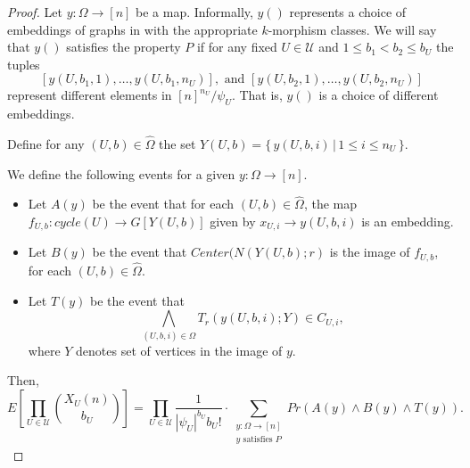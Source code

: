 \documentclass[11pt,notitlepage]{report}
\theoremstyle{definition}
\begin{document}
\begin{proof}
	Let $y: \Omega \rightarrow [n]$ be a map. Informally, $y()$
	represents a choice of embeddings of graphs in with the appropriate
	$k$-morphism classes. We will say that $y()$ satisfies the property
	$P$ if for any fixed $U\in \mathcal{U}$ and $1\leq b_1<b_2\leq b_{U}$
	the tuples
	\[ [y(U,b_1,1), \dots, y(U,b_1,n_U)], \text{ and }
	[y(U,b_2,1), \dots, y(U,b_2,n_U)] \]
	represent different elements in $[n]^{n_U}/\psi_U$. That is, $y()$ is 
	a choice of different embeddings.\par
	Define for any $(U,b)\in \widehat{\Omega}$
	the set $Y(U,b)=\{ \, y(U,b,i) \, | \, 1\leq i \leq n_U \, \}$.
	
	We define the following events for a given $y:\Omega\rightarrow [n]$.
	\begin{itemize}
		\item Let $A(y)$ be the event that for each $(U,b)\in \widehat{\Omega}$,
		the map $f_{U,b}:cycle(U)\rightarrow G[Y(U,b)]$ given
		by $x_{U,i} \rightarrow y(U,b,i)$ is an embedding. 	
		\item Let $B(y)$ be the event that $Center(N(Y(U,b);r)$ is 
		the image of $f_{U,b}$,	for each $(U,b)\in \widehat{\Omega}$.
		\item Let $T(y)$ be the event that 
		\[\bigwedge_{(U,b,i)\in \Omega} T_r(y(U,b,i); Y)\in C_{U,i}, \]
		where $Y$ denotes set of vertices in the image of $y$.  
	\end{itemize}
	Then,
	\[ E\left[\prod_{U\in \mathcal{U}}
	\binom{X_{U}(n)}{b_{U}}\right] = \prod_{U\in \mathcal{U}} 
	\frac{1}{|\psi_U|^{b_U}b_U!} \cdot
	\sum_{\substack{y:\Omega \rightarrow [n]\\y \text{ satisfies }P}}
	Pr(A(y)\wedge B(y)\wedge T(y)). \]
	

\end{proof}
\end{document}
